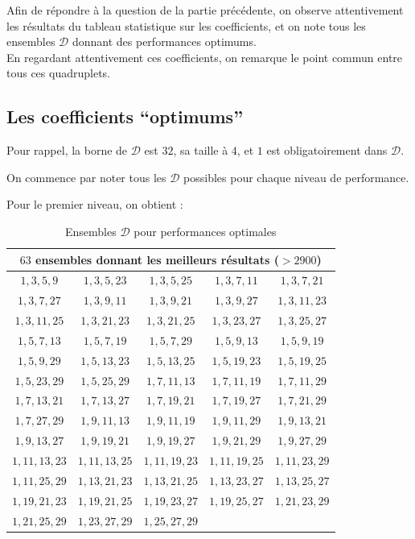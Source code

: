 \documentclass[12pt, a4paper]{memoir}
\begin{document}
  Afin de répondre à la question de la partie précédente, on observe attentivement les résultats du tableau
  statistique sur les coefficients, et on note tous les ensembles $\mathcal{D}$ donnant des 
  performances optimums. \\
  En regardant attentivement ces coefficients, on remarque le point commun entre tous ces quadruplets.
  
  \subsection{Les coefficients ``optimums''}

  Pour rappel, la borne de $\mathcal{D}$ est $32$, sa taille à $4$, et $1$ est obligatoirement dans $\mathcal{D}$.

  On commence par noter tous les $\mathcal{D}$ possibles pour chaque niveau de performance.
  
  Pour le premier niveau, on obtient :
  
\begin{table}[htbp]
\caption{Ensembles $\mathcal{D}$ pour performances optimales }
\begin{center}
\begin{tabular}{ccccc}
\toprule
\multicolumn{5}{c}{$63$ ensembles donnant les meilleurs résultats ($> 2900$)} \\
\midrule
$1,3,5,9$ & $1,3,5,23$ & $1,3,5,25$ & $1,3,7,11$ & $1,3,7,21$ \\
$1,3,7,27$ & $1,3,9,11$ & $1,3,9,21$ & $1,3,9,27$ & $1,3,11,23$ \\
$1,3,11,25$ & $1,3,21,23$ & $1,3,21,25$ & $1,3,23,27$ & $1,3,25,27$ \\
$1,5,7,13$ & $1,5,7,19$ & $1,5,7,29$ & $1,5,9,13$ & $1,5,9,19$ \\
$1,5,9,29$ & $1,5,13,23$ & $1,5,13,25$ & $1,5,19,23$ & $1,5,19,25$ \\
$1,5,23,29$ & $1,5,25,29$ & $1,7,11,13$ & $1,7,11,19$ & $1,7,11,29$ \\
$1,7,13,21$ & $1,7,13,27$ & $1,7,19,21$ & $1,7,19,27$ & $1,7,21,29$ \\ %
$1,7,27,29$ & $1,9,11,13$ & $1,9,11,19$ & $1,9,11,29$ & $1,9,13,21$ \\
$1,9,13,27$ & $1,9,19,21$ & $1,9,19,27$ & $1,9,21,29$ & $1,9,27,29$ \\
$1,11,13,23$ & $1,11,13,25$ & $1,11,19,23$ & $1,11,19,25$ & $1,11,23,29$ \\
$1,11,25,29$ & $1,13,21,23$ & $1,13,21,25$ & $1,13,23,27$ & $1,13,25,27$ \\
$1,19,21,23$ & $1,19,21,25$ & $1,19,23,27$ & $1,19,25,27$ & $1,21,23,29$ \\
$1,21,25,29$ & $1,23,27,29$ & $1,25,27,29$ & \, & \, \\
\bottomrule
\end{tabular}
\end{center}
\label{tab:example}
\end{table}%
  
\end{document}
